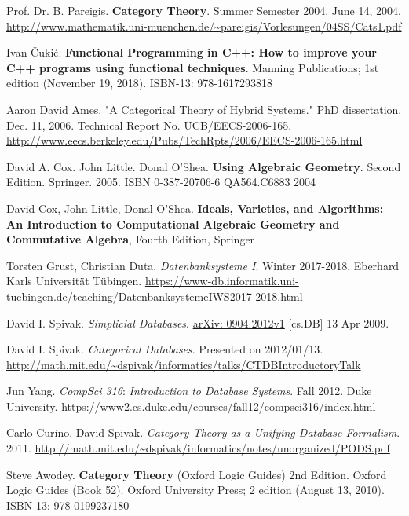 \documentclass[10pt]{amsart}
\begin{document}
\begin{thebibliography}{9}
Prof. Dr. B. Pareigis. \textbf{Category Theory}. Summer Semester 2004. June 14, 2004. \url{http://www.mathematik.uni-muenchen.de/~pareigis/Vorlesungen/04SS/Cats1.pdf}

Ivan \v{C}uki\'{c}. \textbf{Functional Programming in C++: How to improve your C++ programs using functional techniques}. Manning Publications; 1st edition (November 19, 2018). ISBN-13: 978-1617293818


Aaron David Ames. "A Categorical Theory of Hybrid Systems." PhD dissertation. Dec. 11, 2006. Technical Report No. UCB/EECS-2006-165. \url{http://www.eecs.berkeley.edu/Pubs/TechRpts/2006/EECS-2006-165.html}


David A. Cox.  John Little. Donal O'Shea. \textbf{Using Algebraic Geometry}.  Second Edition.  Springer.  2005.  ISBN 0-387-20706-6 QA564.C6883 2004

David Cox, John Little, Donal O'Shea. \textbf{Ideals, Varieties, and Algorithms: An Introduction to Computational Algebraic Geometry and Commutative Algebra}, Fourth Edition, Springer

Torsten Grust, Christian Duta. \emph{Datenbanksysteme I}. Winter 2017-2018. Eberhard Karls Universit\"{a}t T\"{u}bingen.  \url{https://www-db.informatik.uni-tuebingen.de/teaching/DatenbanksystemeIWS2017-2018.html}


David I. Spivak. \emph{Simplicial Databases}. \href{https://arxiv.org/abs/0904.2012}{arXiv: 0904.2012v1} [cs.DB] 13 Apr 2009.

David I. Spivak. \emph{Categorical Databases}. Presented on 2012/01/13. \url{http://math.mit.edu/~dspivak/informatics/talks/CTDBIntroductoryTalk}

Jun Yang. \emph{CompSci 316}: \emph{Introduction to Database Systems}. Fall 2012. Duke University. \url{https://www2.cs.duke.edu/courses/fall12/compsci316/index.html}

Carlo Curino. David Spivak. \emph{Category Theory as a Unifying Database Formalism}. 2011. \url{http://math.mit.edu/~dspivak/informatics/notes/unorganized/PODS.pdf}

Steve Awodey. \textbf{Category Theory} (Oxford Logic Guides) 2nd Edition. Oxford Logic Guides (Book 52). Oxford University Press; 2 edition (August 13, 2010). ISBN-13: 978-0199237180


\end{thebibliography}
\end{document}
